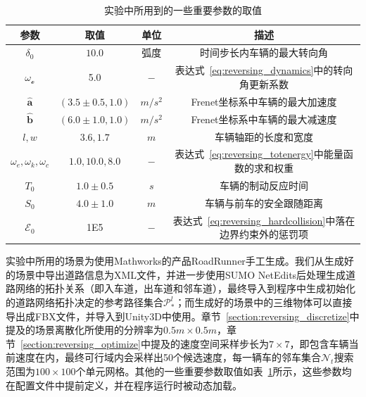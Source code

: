 \begin{table}[!tbh]
\setlength{\belowcaptionskip}{0.4cm}
\centering
\caption[实验中所用到的一些重要参数的取值]{实验中所用到的一些重要参数的取值}
\label{tab:reversing_parameters}
\renewcommand\arraystretch{1.4}
\begin{tabular}{@{}cccc@{}}
\toprule
参数                            & 取值                & 单位      & 描述                                                                                                 \\ \midrule
$\delta_{0}$                         & $10.0$               & 弧度     & 时间步长内车辆的最大转向角        \\
$\omega_{\mathscr{o}}$                & 5.0                  & $-$       & 表达式~\ref{eq:reversing_dynamics}中的转向角更新系数                        \\
$\hat{\textbf{a}}$                   & $(3.5 \pm 0.5, 1.0)$ & $m/s^{2}$ & Frenet坐标系中车辆的最大加速度                                     \\
$\hat{\textbf{b}}$                   & $(6.0 \pm 1.0, 1.0)$ & $m/s^{2}$ & Frenet坐标系中车辆的最大减速度                                           \\
$l, w$                               & $3.6, 1.7$           & $m$       & 车辆轴距的长度和宽度                                                     \\
$\omega_{e}, \omega_{k}, \omega_{c}$ & $1.0, 10.0, 8.0$     & $-$       & 表达式~\ref{eq:reversing_totenergy}中能量函数的求和权重                   \\
$T_{0}$                              & $1.0 \pm 0.5$        & $s$       & 车辆的制动反应时间                                                                  \\
$S_{0}$                              & $4.0 \pm 1.0$        & $m$       & 车辆与前车的安全跟随距离                                      \\
$\mathcal{E}_{0}$                    & 1E5                  & $-$       & 表达式~\ref{eq:reversing_hardcollision}中落在边界约束外的惩罚项 \\ \bottomrule
\end{tabular}
\end{table}


实验中所用的场景为使用Mathworks的产品RoadRunner手工生成。我们从生成好的场景中导出道路信息为XML文件，并进一步使用SUMO NetEdits后处理生成道路网络的拓扑关系（即入车道，出车道和邻车道），最终导入到程序中生成初始化的道路网络拓扑决定的参考路径集合$\mathcal{P}^{l}_{*}$；而生成好的场景中的三维物体可以直接导出成FBX文件，并导入到Unity3D中使用。章节~\ref{section:reversing_discretize}中提及的场景离散化所使用的分辨率为$0.5m \times 0.5m$，章节~\ref{section:reversing_optimize}中提及的速度空间采样步长为$7 \times 7$，即包含车辆当前速度在内，最终可行域内会采样出50个候选速度，每一辆车的邻车集合$\mathcal{N}_{t}$搜索范围为$100 \times 100$个单元网格。其他的一些重要参数取值如表~\ref{tab:reversing_parameters}所示，这些参数均在配置文件中提前定义，并在程序运行时被动态加载。


